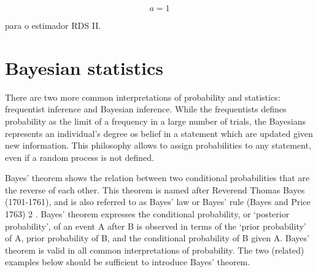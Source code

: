 \begin{equation}
    \label{eq:rdsI}
     a = 1
\end{equation}

 \cite{volz2008probability} para o estimador RDS II. 

\section{Bayesian statistics}

There are two more common interpretations of probability and statistics:
frequentist inference and Bayesian inference. While the frequentists defines
probability as the limit of a frequency in a large number of trials, the
Bayesians represents an individual's degree os belief in a statement which are
updated given new information. This philosophy allows to assign probabilities
to any statement, even if a random process is not defined. 



Bayes’ theorem shows the relation between two conditional probabilities that are the reverse
of each other. This theorem is named after Reverend Thomas Bayes (1701-1761), and is also
referred to as Bayes’ law or Bayes’ rule (Bayes and Price 1763) 2 . Bayes’ theorem expresses
the conditional probability, or ‘posterior probability’, of an event A after B is observed in
terms of the ‘prior probability’ of A, prior probability of B, and the conditional probability
of B given A. Bayes’ theorem is valid in all common interpretations of probability. The two
(related) examples below should be sufficient to introduce Bayes’ theorem.

